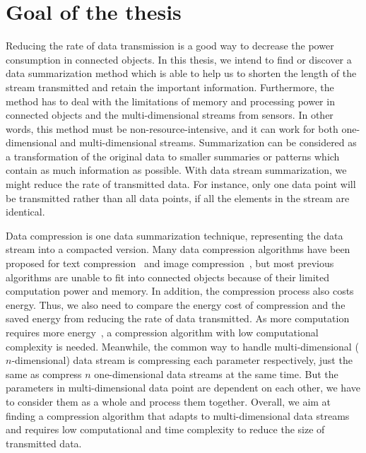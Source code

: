 \section{Goal of the thesis}

Reducing the rate of data transmission is a good way to decrease the power
consumption in connected objects. In this thesis, we intend to find or discover
a data summarization method which is able to help us to shorten the length of
the stream transmitted and retain the important information. Furthermore, the
method has to deal with the limitations of memory and processing power in
connected objects and the multi-dimensional streams from sensors. In other
words, this method must be non-resource-intensive, and it can work for both
one-dimensional and multi-dimensional streams.
Summarization can be considered as a transformation of the original data to
smaller summaries or patterns which contain as much information as possible.
With data stream summarization, we might reduce the rate of transmitted data.
For instance, only one data point will be transmitted rather than all data
points, if all the elements in the stream are identical. 

Data compression is one data summarization technique, representing the data
stream into a compacted version. Many data compression algorithms have been
proposed for text compression~\cite{shanmugasundaram2011comparative,
sayood2017introduction} and image compression~\cite{shum2003survey,
zaineldin2015image}, but most previous algorithms are unable to fit into
connected objects because of their limited computation power and memory. In
addition, the compression process also costs energy. Thus, we also need to
compare the energy cost of compression and the saved energy from reducing the
rate of data transmitted. As more computation requires more
energy~\cite{pope2018accelerometer}, a compression algorithm with low
computational complexity is needed.  Meanwhile, the common way to handle
multi-dimensional ($n$-dimensional) data stream is compressing each parameter
respectively, just the same as compress $n$ one-dimensional data streams at the
same time. But the parameters in multi-dimensional data point are dependent on
each other, we have to consider them as a whole and process them together.
Overall, we aim at finding a compression algorithm that adapts to
multi-dimensional data streams and requires low computational and time
complexity to reduce the size of transmitted data.

